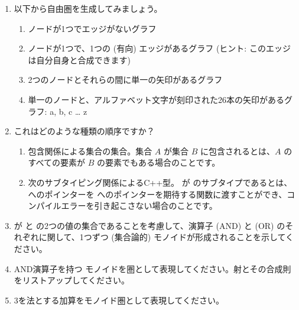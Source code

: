 \begin{enumerate}
  \tightlist
  \item
        以下から自由圏を生成してみましょう。

        \begin{enumerate}
          \tightlist
          \item
                ノードが1つでエッジがないグラフ
          \item
                ノードが1つで、1つの (有向) エッジがあるグラフ (ヒント: このエッジは自分自身と合成できます) 
          \item
                2つのノードとそれらの間に単一の矢印があるグラフ
          \item
                単一のノードと、アルファベット文字が刻印された26本の矢印があるグラフ: a, b, c \ldots{} z
        \end{enumerate}
  \item
        これはどのような種類の順序ですか？

        \begin{enumerate}
          \tightlist
          \item
                包含関係による集合の集合。集合 $A$ が集合 $B$ に包含されるとは、$A$ のすべての要素が $B$ の要素でもある場合のことです。
          \item
                次のサブタイピング関係によるC++型。 が  のサブタイプであるとは、 へのポインターを  へのポインターを期待する関数に渡すことができ、コンパイルエラーを引き起こさない場合のことです。
        \end{enumerate}
  \item
         が  と  の2つの値の集合であることを考慮して、演算子 \code{\&\&} (AND) と \code{||} (OR) のそれぞれに関して、1つずつ (集合論的) モノイドが形成されることを示してください。
  \item
        AND演算子を持つ  モノイドを圏として表現してください。射とその合成則をリストアップしてください。
  \item
        3を法とする加算をモノイド圏として表現してください。
\end{enumerate}

